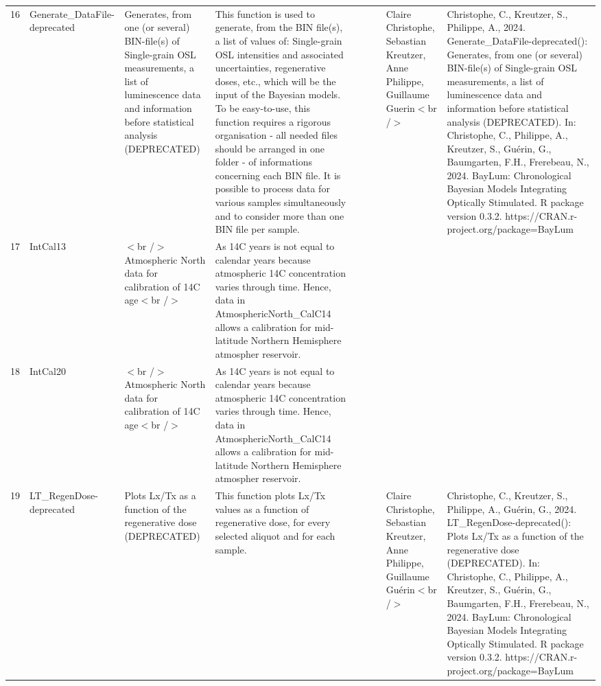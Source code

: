 \begin{table}[ht]
\begin{tabular}{rllllllll}
  16 & Generate\_DataFile-deprecated & Generates, from one (or several) BIN-file(s) of Single-grain OSL measurements, a list of luminescence data and information before statistical analysis (DEPRECATED) & This function is used to generate, from the BIN file(s), a list of values of: Single-grain  OSL intensities and associated uncertainties, regenerative doses, etc., which will be the input of the Bayesian models. To be easy-to-use, this function requires a rigorous organisation - all needed files should be arranged in one folder - of informations concerning each BIN file.   It is possible to process data for various samples simultaneously and to consider more than one BIN file per sample. &  &  &  & Claire Christophe, Sebastian Kreutzer, Anne Philippe, Guillaume Guerin$<$br /$>$ & Christophe, C., Kreutzer, S., Philippe, A., 2024. Generate\_DataFile-deprecated(): Generates, from one (or several) BIN-file(s) of Single-grain OSL measurements, a list of luminescence data and information before statistical analysis (DEPRECATED). In: Christophe, C., Philippe, A., Kreutzer, S., Guérin, G., Baumgarten, F.H., Frerebeau, N., 2024. BayLum: Chronological Bayesian Models Integrating Optically Stimulated. R package version 0.3.2. https://CRAN.r-project.org/package=BayLum
 \\ 
  17 & IntCal13 & $<$br /$>$ Atmospheric North data for calibration of 14C age$<$br /$>$ & As 14C years is not equal to calendar years because atmospheric 14C concentration varies through time. Hence, data in AtmosphericNorth\_CalC14 allows a calibration for mid-latitude Northern Hemisphere atmospher reservoir. &  &  &  &  &  \\ 
  18 & IntCal20 & $<$br /$>$ Atmospheric North data for calibration of 14C age$<$br /$>$ & As 14C years is not equal to calendar years because atmospheric 14C concentration varies through time. Hence, data in AtmosphericNorth\_CalC14 allows a calibration for mid-latitude Northern Hemisphere atmospher reservoir. &  &  &  &  &  \\ 
  19 & LT\_RegenDose-deprecated & Plots Lx/Tx as a function of the regenerative dose (DEPRECATED) & This function plots  Lx/Tx  values as a function of regenerative dose, for every selected aliquot and for each sample. &  &  &  & Claire Christophe, Sebastian Kreutzer, Anne Philippe, Guillaume Guérin$<$br /$>$ & Christophe, C., Kreutzer, S., Philippe, A., Guérin, G., 2024. LT\_RegenDose-deprecated(): Plots Lx/Tx as a function of the regenerative dose (DEPRECATED). In: Christophe, C., Philippe, A., Kreutzer, S., Guérin, G., Baumgarten, F.H., Frerebeau, N., 2024. BayLum: Chronological Bayesian Models Integrating Optically Stimulated. R package version 0.3.2. https://CRAN.r-project.org/package=BayLum

\end{tabular}
\end{table}
